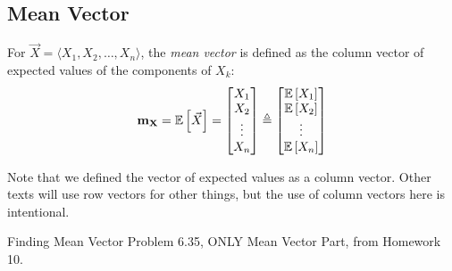 	\subsection{Mean Vector} \label{subsec:Mean Vector}
		\begin{definition} \label{def:Mean Vector}
			For $\vec{X} = \langle X_{1},X_{2},\ldots,X_{n} \rangle$, the \emph{mean vector} is defined as the column vector of expected values of the components of $X_{k}$:
			\begin{equation} \label{eq:Mean Vector}
				\mathbf{m_{X}}
				= \operatorname{\operatorname{\mathbb{E}}} \left[ \vec{X} \right]
				= \begin{bmatrix}
					X_{1} \\
					X_{2} \\
					\vdots \\
					X_{n}
				\end{bmatrix}
				\triangleq \begin{bmatrix}
					\operatorname{\operatorname{\mathbb{E}}} \left[ X_{1} \right] \\
					\operatorname{\operatorname{\mathbb{E}}} \left[ X_{2} \right] \\
					\vdots \\
					\operatorname{\operatorname{\mathbb{E}}} \left[ X_{n} \right] \\
				\end{bmatrix}
			\end{equation}
			\begin{remark}
				Note that we defined the vector of expected values as a column vector.
				Other texts will use row vectors for other things, but the use of column vectors here is intentional.
			\end{remark}
		\end{definition}
		\begin{example}[Problem 6.35]{Finding Mean Vector}
			Problem 6.35, ONLY Mean Vector Part, from Homework 10.
		\end{example}
	
